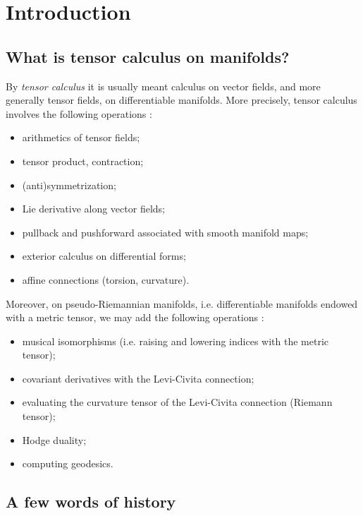 \chapter{Introduction} \label{s:int}

\minitoc

\section{What is tensor calculus on manifolds?}

By \emph{tensor calculus} it is usually meant calculus on vector fields,
and more generally tensor fields, on differentiable manifolds. More precisely,
tensor calculus involves the following operations \cite{Lee13}:
\begin{itemize}
\item arithmetics of tensor fields;
\item tensor product, contraction;
\item (anti)symmetrization;
\item Lie derivative along vector fields;
\item pullback and pushforward associated with smooth manifold maps;
\item exterior calculus on differential forms;
\item affine connections (torsion, curvature).
\end{itemize}
Moreover, on pseudo-Riemannian manifolds, i.e. differentiable manifolds endowed
with a metric tensor, we may add the following
operations \cite{Lee97,ONeil83}:
\begin{itemize}
\item musical isomorphisms (i.e. raising and lowering indices with the metric tensor);
\item covariant derivatives with the Levi-Civita connection;
\item evaluating the curvature tensor of the Levi-Civita connection (Riemann tensor);
\item Hodge duality;
\item computing geodesics.
\end{itemize}


\section{A few words of history}

